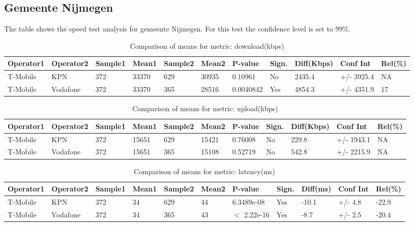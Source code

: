 \documentclass[]{article}
\begin{document}
\normalsize

\newpage

\subsection{Gemeente Nijmegen}\label{gemeente-nijmegen}

The table shows the speed test analysis for gemeente Nijmegen. For this
test the confidence level is set to 99\%.

\begin{table}[ht]
\centering
{\footnotesize
\begin{tabular}{lllllllllll}
  \hline
Operator1 & Operator2 & Sample1 & Mean1 & Sample2 & Mean2 & P-value & Sign. & Diff(Kbps) & Conf Int & Rel(\%) \\ 
  \hline
T-Mobile & KPN & 372 & 33370 & 629 & 30935 & 0.10961 & No & 2435.4 & +/- 3925.4 & NA \\ 
  T-Mobile & Vodafone & 372 & 33370 & 365 & 28516 & 0.0040842 & Yes & 4854.3 & +/- 4351.9 & 17 \\ 
   \hline
\end{tabular}
}
\caption{Comparison of means for metric: download(kbps)} 
\end{table}\begin{table}[ht]
\centering
{\footnotesize
\begin{tabular}{lllllllllll}
  \hline
Operator1 & Operator2 & Sample1 & Mean1 & Sample2 & Mean2 & P-value & Sign. & Diff(Kbps) & Conf Int & Rel(\%) \\ 
  \hline
T-Mobile & KPN & 372 & 15651 & 629 & 15421 & 0.76008 & No & 229.8 & +/- 1943.1 & NA \\ 
  T-Mobile & Vodafone & 372 & 15651 & 365 & 15108 & 0.52719 & No & 542.8 & +/- 2215.9 & NA \\ 
   \hline
\end{tabular}
}
\caption{Comparison of means for metric: upload(kbps)} 
\end{table}\begin{table}[ht]
\centering
{\footnotesize
\begin{tabular}{lllllllllll}
  \hline
Operator1 & Operator2 & Sample1 & Mean1 & Sample2 & Mean2 & P-value & Sign. & Diff(ms) & Conf Int & Rel(\%) \\ 
  \hline
T-Mobile & KPN & 372 & 34 & 629 & 44 & 6.3489e-08 & Yes & -10.1 & +/- 4.8 & -22.9 \\ 
  T-Mobile & Vodafone & 372 & 34 & 365 & 43 & $<$ 2.22e-16 & Yes & -8.7 & +/- 2.5 & -20.4 \\ 
   \hline
\end{tabular}
}
\caption{Comparison of means for metric: latency(ms)} 
\end{table}
\end{document}
